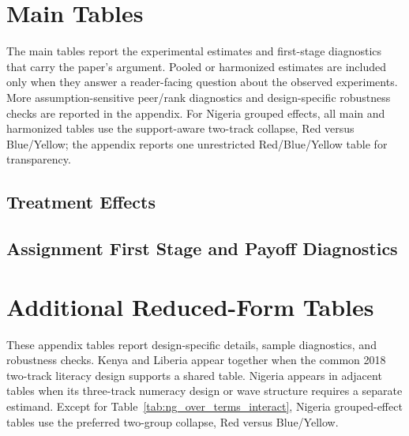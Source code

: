\documentclass[11pt]{article}
\begin{document}

\clearpage
\section*{Main Tables}

\noindent The main tables report the experimental estimates and first-stage diagnostics that carry the paper's argument. Pooled or harmonized estimates are included only when they answer a reader-facing question about the observed experiments. More assumption-sensitive peer/rank diagnostics and design-specific robustness checks are reported in the appendix. For Nigeria grouped effects, all main and harmonized tables use the support-aware two-track collapse, Red versus Blue/Yellow; the appendix reports one unrestricted Red/Blue/Yellow table for transparency.

\subsection*{Treatment Effects}





\subsection*{Assignment First Stage and Payoff Diagnostics}




\clearpage
\appendix
\setcounter{table}{0}
\setcounter{figure}{0}
\renewcommand{\thetable}{A\arabic{table}}
\renewcommand{\thefigure}{A\arabic{figure}}

\section{Additional Reduced-Form Tables}
\label{app:rf_tables}

\noindent These appendix tables report design-specific details, sample diagnostics, and robustness checks. Kenya and Liberia appear together when the common 2018 two-track literacy design supports a shared table. Nigeria appears in adjacent tables when its three-track numeracy design or wave structure requires a separate estimand. Except for Table~\ref{tab:ng_over_terms_interact}, Nigeria grouped-effect tables use the preferred two-group collapse, Red versus Blue/Yellow.
\end{document}

